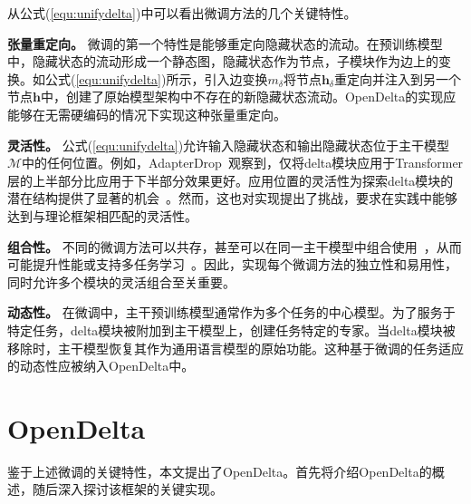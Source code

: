 从公式(\ref{equ:unifydelta})中可以看出微调方法的几个关键特性。

\textbf{张量重定向。} 微调的第一个特性是能够重定向隐藏状态的流动。在预训练模型中，隐藏状态的流动形成一个静态图，隐藏状态作为节点，子模块作为边上的变换。如公式(\ref{equ:unifydelta})所示，引入边变换$m_\delta$将节点$\mathbf{h}_{\delta}$重定向并注入到另一个节点$\mathbf{h}$中，创建了原始模型架构中不存在的新隐藏状态流动。OpenDelta的实现应能够在无需硬编码的情况下实现这种张量重定向。

\textbf{灵活性。}
公式(\ref{equ:unifydelta})允许输入隐藏状态和输出隐藏状态位于主干模型$\mathcal{M}$中的任何位置。例如，AdapterDrop~\cite{ruckle-etal-2021-adapterdrop}观察到，仅将delta模块应用于Transformer层的上半部分比应用于下半部分效果更好。应用位置的灵活性为探索delta模块的潜在结构提供了显著的机会~\cite{hu2022sparse}。然而，这也对实现提出了挑战，要求在实践中能够达到与理论框架相匹配的灵活性。

\textbf{组合性。} 不同的微调方法可以共存，甚至可以在同一主干模型中组合使用~\cite{hu2022sparse}，从而可能提升性能或支持多任务学习~\cite{pfeiffer2020adapterfusion}。因此，实现每个微调方法的独立性和易用性，同时允许多个模块的灵活组合至关重要。

\textbf{动态性。} 在微调中，主干预训练模型通常作为多个任务的中心模型。为了服务于特定任务，delta模块被附加到主干模型上，创建任务特定的专家。当delta模块被移除时，主干模型恢复其作为通用语言模型的原始功能。这种基于微调的任务适应的动态性应被纳入OpenDelta中。


\section{OpenDelta}

 鉴于上述微调的关键特性，本文提出了OpenDelta。首先将介绍OpenDelta的概述，随后深入探讨该框架的关键实现。


\begin{table*}
\centering
\caption{微调方法及其特性。默认位置指的是当未指定特定子模块时，delta模块附加的位置。$\mathbf{A}$,$\mathbf{B}$,$\mathbf{W}_1$,$\mathbf{W}_2$是权重矩阵，$\mathbf{b}$是偏置向量。MLP($\cdot$)是多层感知网络。$[\cdot;\cdot]$表示张量的拼接。$\sigma$是激活函数。运行时初始化显示OpenDelta的实现是否使用此技术。}
\label{tab:defaultconfig} 
\end{table*}

